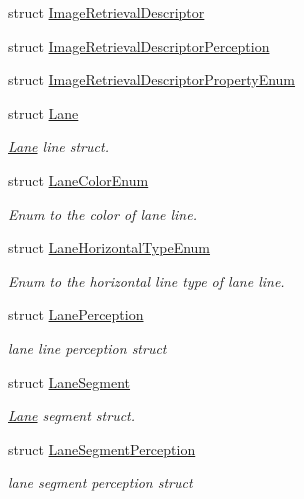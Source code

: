 \begin{DoxyCompactItemize}
struct \hyperlink{structmaf__perception__interface_1_1ImageRetrievalDescriptor}{Image\+Retrieval\+Descriptor}
\item 
struct \hyperlink{structmaf__perception__interface_1_1ImageRetrievalDescriptorPerception}{Image\+Retrieval\+Descriptor\+Perception}
\item 
struct \hyperlink{structmaf__perception__interface_1_1ImageRetrievalDescriptorPropertyEnum}{Image\+Retrieval\+Descriptor\+Property\+Enum}
\item 
struct \hyperlink{structmaf__perception__interface_1_1Lane}{Lane}
\begin{DoxyCompactList}\small\item\em \hyperlink{structmaf__perception__interface_1_1Lane}{Lane} line struct. \end{DoxyCompactList}\item 
struct \hyperlink{structmaf__perception__interface_1_1LaneColorEnum}{Lane\+Color\+Enum}
\begin{DoxyCompactList}\small\item\em Enum to the color of lane line. \end{DoxyCompactList}\item 
struct \hyperlink{structmaf__perception__interface_1_1LaneHorizontalTypeEnum}{Lane\+Horizontal\+Type\+Enum}
\begin{DoxyCompactList}\small\item\em Enum to the horizontal line type of lane line. \end{DoxyCompactList}\item 
struct \hyperlink{structmaf__perception__interface_1_1LanePerception}{Lane\+Perception}
\begin{DoxyCompactList}\small\item\em lane line perception struct \end{DoxyCompactList}\item 
struct \hyperlink{structmaf__perception__interface_1_1LaneSegment}{Lane\+Segment}
\begin{DoxyCompactList}\small\item\em \hyperlink{structmaf__perception__interface_1_1Lane}{Lane} segment struct. \end{DoxyCompactList}\item 
struct \hyperlink{structmaf__perception__interface_1_1LaneSegmentPerception}{Lane\+Segment\+Perception}
\begin{DoxyCompactList}\small\item\em lane segment perception struct \end{DoxyCompactList}\item 

\end{DoxyCompactItemize}

